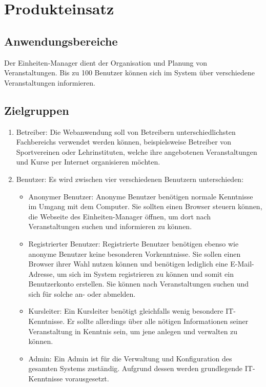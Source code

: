 \documentclass[a4paper]{scrreprt}
\begin{document}
  
\chapter{Produkteinsatz}
    \section{Anwendungsbereiche}
		 Der \gls{Einheiten}-Manager dient der Organisation und Planung von Veranstaltungen. Bis zu 100 Benutzer können sich im System über verschiedene Veranstaltungen informieren.   
     
	\section{Zielgruppen}
		 \begin{enumerate}
		 	\item Betreiber: Die Webanwendung soll von Betreibern unterschiedlichsten Fachbereichs verwendet werden können, beispielsweise Betreiber von Sportvereinen oder Lehrinstituten, welche ihre angebotenen Veranstaltungen und Kurse per Internet organisieren möchten.
		 	\item Benutzer: Es wird zwischen vier verschiedenen Benutzern unterschieden:
		 	\begin{itemize}
		 		\item Anonymer Benutzer: Anonyme Benutzer benötigen normale Kenntnisse im Umgang mit dem Computer. Sie sollten einen \gls{Browser} steuern können, die Webseite des \gls{Einheiten}-Manager öffnen, um dort nach Veranstaltungen suchen und informieren zu können.
		 		\item Registrierter Benutzer: Registrierte Benutzer benötigen ebenso wie anonyme Benutzer keine besonderen Vorkenntnisse. Sie sollen einen \gls{Browser} ihrer Wahl nutzen können und benötigen lediglich eine E-Mail-Adresse, um sich im System registrieren zu können und somit ein Benutzerkonto erstellen. Sie können nach Veranstaltungen suchen und sich für solche an- oder abmelden.
		 		\item Kursleiter: Ein Kursleiter benötigt gleichfalls wenig besondere IT-Kenntnisse. Er sollte allerdings über alle nötigen Informationen seiner Veranstaltung in Kenntnis sein, um jene anlegen und verwalten zu können.
		 		\item \gls{Admin}: Ein \gls{Admin} ist für die Verwaltung und \gls{Konfiguration} des gesamten Systems zuständig. Aufgrund dessen werden grundlegende IT-Kenntnisse vorausgesetzt.
		 	\end{itemize}	
		 \end{enumerate}  
        
\end{document}
